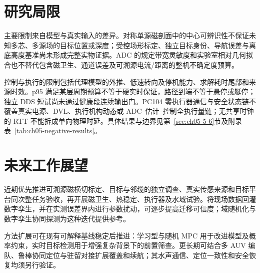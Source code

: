 \section{研究局限}\label{sec:ch06-6-2}

主要限制来自模型与真实输入的差异。对称单源磁剖面中的中心可辨识性不保证未知多芯、多源场的目标位置或深度；受控场形标定、独立目标身份、导航误差与离底高度基准尚未形成完整实物证据。ADC 的规定带宽灵敏度和实验室相对几何拟合也不替代包含磁卫生、通道误差及可溯源电流/距离的整机不确定度预算。

控制与执行的限制包括代理模型的外推、低速转向及停机能力、求解耗时尾部和来源时效。p95 满足某层周期预算不等于硬实时保证，路径到端不等于悬停或艇停；独立 DDS 短试尚未通过健康段连续输出门。PC104 零执行器通信与安全状态链不覆盖真实电源、DVL、执行机构动态或 ADC--估计--控制全执行量链；无共享时钟的 RTT 不能拆成单向物理时延。具体结果与边界见第~\ref{sec:ch05-5-6}节及附录表~\ref{tab:ch05-negative-results}。

\section{未来工作展望}\label{sec:ch06-6-3}

近期优先推进可溯源磁横切标定、目标与邻缆的独立调查、真实传感来源和目标平台同次整任务验收，再开展磁卫生、热稳定、执行器及水域试验。将现场数据回灌数字孪生，并在实测误差界内进行参数扰动，可逐步提高迁移可信度；域随机化与数字孪生协同探测为这种迭代提供参考\cite{tobin2017domain,yan2026digitaltwin}。

方法扩展可在现有可解释基线稳定后推进：学习型与随机 MPC 用于改进模型及概率约束\cite{hewing2020learning,zarrouki2024stochastic}，实时目标检测用于增强复杂背景下的前置筛查\cite{bodenmann2024realtime}。更长期可结合多 AUV 编队、鲁棒协同定位与驻留对接扩展覆盖和续航\cite{yan2023formation,li2025cooplocalization,curtin2018resident}；其水声通信、定位一致性和安全恢复均须另行验证。
